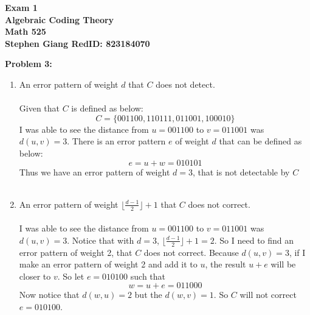 \documentclass[11pt]{article}
\newenvironment{problem}[1]{\textbf{Problem #1: }}{\newpage}
\begin{document}
	
	\begin{center}
		\textbf{Exam 1} \\
		\textbf{Algebraic Coding Theory} \\
		\textbf{Math 525} \\
		\textbf{Stephen Giang RedID: 823184070} \\
	\end{center}

	\begin{problem}{3}
		\begin{enumerate}[label = (\alph*)]
			\item An error pattern of weight $d$ that $C$ does not detect.
			\\ \\
			Given that $C$ is defined as below:
			\[C = \{001100,110111,011001,100010\}\]
			I was able to see the distance from $u = 001100$ to $v = 011001$ was $d(u,v) = 3$.  There is an error pattern $e$ of weight $d$ that can be defined as below:
			\[e = u + w = 010101\]
			Thus we have an error pattern of weight $d = 3$, that is not detectable by $C$
			\\ \\
			\item An error pattern of weight $\lfloor \frac{d-1}{2}\rfloor + 1$ that $C$ does not correct.
			\\ \\
			I was able to see the distance from $u = 001100$ to $v = 011001$ was $d(u,v) = 3$. Notice that with $d = 3$, $\lfloor \frac{d-1}{2}\rfloor + 1 = 2$.  So I need to find an error pattern of weight 2, that $C$ does not correct.  Because $d(u,v) = 3$, if I make an error pattern of weight 2 and add it to $u$, the result $u + e$ will be closer to $v$. So let $e = 010100$ such that  
			\[w = u + e = 011000\]
			Now notice that $d(w,u) = 2$ but the $d(w,v) = 1$.  So $C$ will not correct $e = 010100$.
		\end{enumerate}
	\end{problem}
\end{document}
